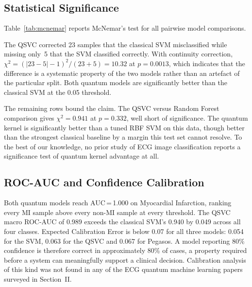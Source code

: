 \documentclass[10pt,conference]{IEEEtran}
\begin{document}
\subsection{Statistical Significance}
\label{sec:sig}

Table~\ref{tab:mcnemar} reports McNemar's test for all pairwise model
comparisons.

\begin{table}[t]
\caption{McNemar's Test Results ($n=186$ Test Samples)}
\label{tab:mcnemar}
\centering
\renewcommand{\arraystretch}{1.1}
\end{table}

The QSVC corrected 23 samples that the classical SVM misclassified
while missing only~5 that the SVM classified correctly. With continuity
correction, $\chi^2=(|23-5|-1)^2/(23+5)=10.32$ at $p=0.0013$, which
indicates that the difference is a systematic property of the two
models rather than an artefact of the particular split. Both quantum
models are significantly better than the classical SVM at the 0.05
threshold.

The remaining rows bound the claim. The QSVC versus Random Forest
comparison gives $\chi^2=0.941$ at $p=0.332$, well short of
significance. The quantum kernel is significantly better than a tuned
RBF SVM on this data, though better than the strongest classical
baseline by a margin this test set cannot resolve. To the best of our
knowledge, no prior study of ECG image classification reports a
significance test of quantum kernel advantage at all.

\subsection{ROC-AUC and Confidence Calibration}
\label{sec:roc-roc}

Both quantum models reach AUC\,=\,1.000 on Myocardial Infarction,
ranking every MI sample above every non-MI sample at every threshold.
The QSVC macro ROC-AUC of 0.989 exceeds the classical SVM's 0.940 by
0.049 across all four classes. Expected Calibration Error is below 0.07
for all three models: 0.054 for the SVM, 0.063 for the QSVC and 0.067
for Pegasos. A model reporting 80\% confidence is therefore correct in
approximately 80\% of cases, a property required before a system can
meaningfully support a clinical decision. Calibration analysis of this
kind was not found in any of the ECG quantum machine learning papers
surveyed in Section~II.
\end{document}
